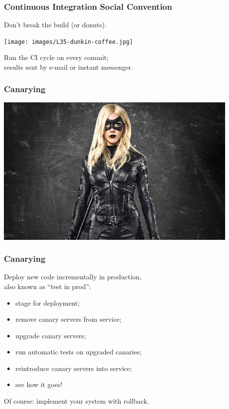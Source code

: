 \begin{frame}
\frametitle{Continuous Integration Social Convention}

\Large
\begin{changemargin}{1cm}
Don't break the build (or donuts).
\end{changemargin}
\begin{center}
\texttt{[image: images/L35-dunkin-coffee.jpg]}
\end{center}

\begin{changemargin}{1cm}
Run the CI cycle on every commit;\\
results sent by e-mail or instant messenger.
\end{changemargin}
\end{frame}

\begin{frame}
\frametitle{Canarying}

\begin{center}
	\includegraphics[width=0.9\textwidth]{images/blackcanary.jpg}
\end{center}

\end{frame}



\begin{frame}
\frametitle{Canarying}

\large
\begin{changemargin}{1cm}
Deploy new code incrementally in production, \\
also known as ``test in prod'':


\begin{itemize}
\item stage for deployment;
\item remove canary servers from service;
\item upgrade canary servers;
\item run automatic tests on upgraded canaries;
\item reintroduce canary servers into service;
\item see how it goes!
\end{itemize}

Of course: implement your system with rollback.
\end{changemargin}

\end{frame}




